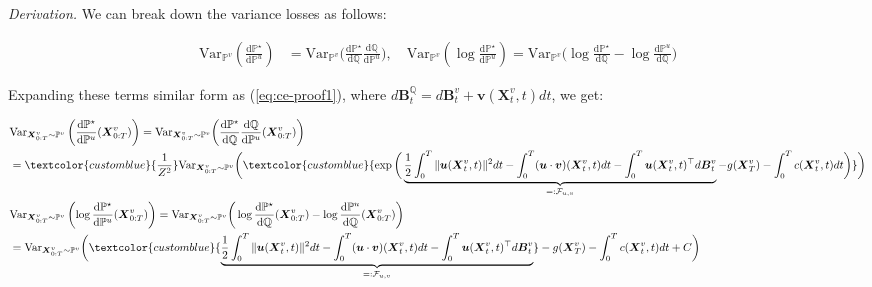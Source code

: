 \documentclass{article}
\newcommand{\bluetext}[1]{\textcolor{customblue}{#1}}
\begin{document}
\textit{Derivation.} We can break down the variance losses as follows:
\begin{small}
\begin{align}
    \text{Var}_{\mathbb{P}^v}\left( \frac{\mathrm{d}\mathbb{P}^\star}{\mathrm{d}\mathbb{P}^u}\right)&=\text{Var}_{\mathbb{P}^v}\bigg( \frac{\mathrm{d}\mathbb{P}^\star}{\mathrm{d}\mathbb{Q}}\frac{\mathrm{d}\mathbb{Q}}{\mathrm{d}\mathbb{{P}}^u}\bigg)
    , \quad\text{Var}_{\mathbb{P}^v}\left( \log \frac{\mathrm{d}\mathbb{P}^\star}{\mathrm{d}\mathbb{P}^u}\right)=\text{Var}_{\mathbb{P}^v}\bigg(\log  \frac{\mathrm{d}\mathbb{P}^\star}{\mathrm{d}\mathbb{Q}}-\log \frac{\mathrm{d}\mathbb{P}^u}{\mathrm{d}\mathbb{{Q}}}\bigg)
\end{align}
\end{small}
Expanding these terms similar form as (\ref{eq:ce-proof1}), where $d\boldsymbol{B}^{\mathbb{Q}}_t=d\boldsymbol{B}^v_t+\boldsymbol{v}(\boldsymbol{X}_t^v,t)dt$, we get:
\begin{small}
\begin{align}
    &\text{Var}_{\boldsymbol{X}_{0:T}^v\sim\mathbb{P}^v}\left( \frac{\mathrm{d}\mathbb{P}^\star}{\mathrm{d}\mathbb{P}^u}(\boldsymbol{X}_{0:T}^v)\right)=\text{Var}_{\boldsymbol{X}_{0:T}^v\sim \mathbb{P}^v}\bigg( \frac{\mathrm{d}\mathbb{P}^\star}{\mathrm{d}\mathbb{Q}}\frac{\mathrm{d}\mathbb{Q}}{\mathrm{d}\mathbb{{P}}^u}(\boldsymbol{X}_{0:T}^v)\bigg)\nonumber\\
    &=\bluetext{\frac{1}{Z^2}}\text{Var}_{\boldsymbol{X}_{0:T}^v\sim\mathbb{P}^v}\bigg(\bluetext{\exp\bigg(\underbrace{\frac{1}{2}\int_0^T\|\boldsymbol{u}(\boldsymbol{X}^v_t,t)\|^2dt-\int_0^T(\boldsymbol{u}\cdot\boldsymbol{v})(\boldsymbol{X}^v_t,t)dt-\int_0^T\boldsymbol{u}(\boldsymbol{X}^v_t,t)^\top d\boldsymbol{B}^v_t}_{=:\mathcal{F}_{u,v}}-g(\boldsymbol{X}^v_T)-\int_0^Tc(\boldsymbol{X}^v_t,t)dt\bigg)}\bigg)\nonumber\\
    &\text{Var}_{\boldsymbol{X}_{0:T}^v\sim\mathbb{P}^v}\left( \log\frac{\mathrm{d}\mathbb{P}^\star}{\mathrm{d}\mathbb{P}^u}(\boldsymbol{X}_{0:T}^v) \right)=\text{Var}_{\boldsymbol{X}_{0:T}^v\sim \mathbb{P}^v}\bigg(\log  \frac{\mathrm{d}\mathbb{P}^\star}{\mathrm{d}\mathbb{Q}}(\boldsymbol{X}_{0:T}^v)-\log \frac{\mathrm{d}\mathbb{P}^u}{\mathrm{d}\mathbb{{Q}}}(\boldsymbol{X}_{0:T}^v)\bigg)\nonumber\\
    &=\text{Var}_{\boldsymbol{X}_{0:T}^v\sim\mathbb{P}^v}\bigg( \bluetext{\underbrace{\frac{1}{2}\int_0^T\|\boldsymbol{u}(\boldsymbol{X}^v_t,t)\|^2dt-\int_0^T(\boldsymbol{u}\cdot\boldsymbol{v})(\boldsymbol{X}^v_t,t)dt-\int_0^T\boldsymbol{u}(\boldsymbol{X}^v_t,t)^\top d\boldsymbol{B}^v_t}_{=:\mathcal{F}_{u,v}}}-g(\boldsymbol{X}^v_T)-\int_0^Tc(\boldsymbol{X}^v_t,t)dt+C\bigg)\nonumber
\end{align}
\end{small}
\end{document}

